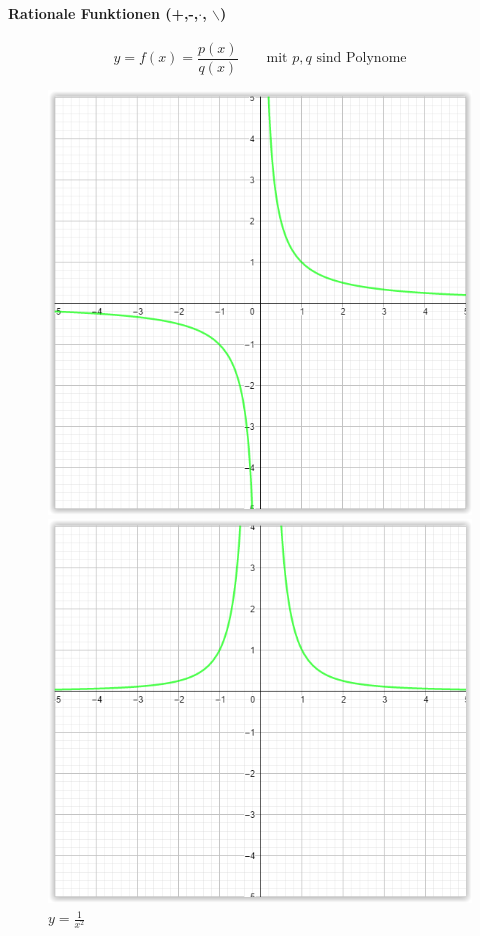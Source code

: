 \documentclass[12pt,a4paper]{report}%
\numberwithin{equation}{section}
\newcommand{\subsubsubsection}{\paragraph}
\numberwithin{equation}{subsection}
\begin{document}
		\vspace{-0.5cm}
		\newpage
		\subsubsubsection{Rationale Funktionen (+,-,$\cdot$, $\backslash$)}
		\begin{equation}
		  y = f(x) = \frac{p(x)}{q(x)} \qquad \text{mit } p,q \text{ sind Polynome}
		\end{equation}
		\begin{figure}[H] 
		\centering
		\begin{minipage}{.5\textwidth}
		  \centering
		  \includegraphics[width=0.6\linewidth]{funktionen_pole_1.png}
		  \caption{$y = \frac{1}{x}$}
		  \label{fig:funkt_pole_1}
		\end{minipage}%
		\begin{minipage}{.5\textwidth}
		  \centering
		  \includegraphics[width=0.65\linewidth]{funktionen_pole_2.png}
		  \caption{$y = \frac{1}{x^2}$}
		  \label{fig:funkt_pole_2}
		\end{minipage}
		\end{figure}
		
\end{document}
